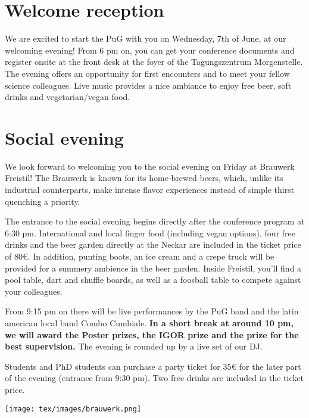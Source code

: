 
\section*{Welcome reception}
We are excited to start the PuG with you on Wednesday, 7th of June, at our welcoming evening! From 6 pm on, you can get your conference documents and register onsite at the front desk at the foyer of the Tagungszentrum Morgenstelle. The evening offers an opportunity for first encounters and to meet your fellow science colleagues. Live music provides a nice ambiance to enjoy free beer, soft drinks and vegetarian/vegan food.

\section*{Social evening}
We look forward to welcoming you to the social evening on Friday at Brauwerk Freistil! The Brauwerk is known for its home-brewed beers, which, unlike its industrial counterparts, make intense flavor experiences instead of simple thirst quenching a priority.

The entrance to the social evening begins directly after the conference program at 6:30 pm. International and local finger food (including vegan options), four free drinks and the beer garden directly at the Neckar are included in the ticket price of 80€. In addition, punting boats, an ice cream and a crepe truck will be provided for a summery ambience in the beer garden. Inside Freistil, you'll find a pool table, dart and shuffle boards, as well as a foosball table to compete against your colleagues. 

From 9:15 pm on there will be live performances by the PuG band and the latin american local band Combo Cumbiale. \textbf{In a short break at around 10 pm, we will award the Poster prizes, the IGOR prize and the prize for the best supervision.} The evening is rounded up by a live set of our DJ. 

Students and PhD students can purchase a party ticket for 35€ for the later part of the evening (entrance from 9:30 pm). Two free drinks are included in the ticket price.

\begin{center}
	\texttt{[image: tex/images/brauwerk.png]}
\end{center}


